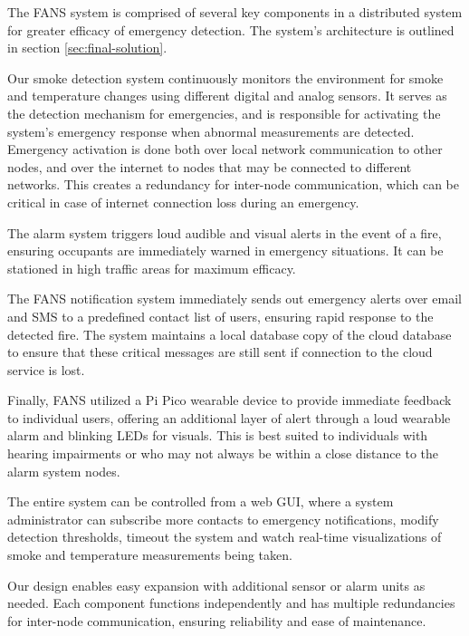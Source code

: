 The FANS system is comprised of several key components in a distributed system for greater efficacy of emergency
detection. The system's architecture is outlined in section \ref{sec:final-solution}.

Our smoke detection system continuously monitors the environment for smoke and temperature changes using different
digital and analog sensors. It serves as the detection mechanism for emergencies, and is responsible for activating the
system's emergency response when abnormal measurements are detected. Emergency activation is done both over local
network communication to other nodes, and over the internet to nodes that may be connected to different networks. This
creates a redundancy for inter-node communication, which can be critical in case of internet connection loss during an
emergency.

The alarm system triggers loud audible and visual alerts in the event of a fire, ensuring occupants are immediately
warned in emergency situations. It can be stationed in high traffic areas for maximum efficacy.

The FANS notification system immediately sends out emergency alerts over email and SMS to a predefined contact list of
users, ensuring rapid response to the detected fire. The system maintains a local database copy of the cloud database
to ensure that these critical messages are still sent if connection to the cloud service is lost.

Finally, FANS utilized a Pi Pico wearable device to provide immediate feedback to individual users, offering an
additional layer of alert through a loud wearable alarm and blinking LEDs for visuals. This is best suited to
individuals with hearing impairments or who may not always be within a close distance to the alarm system nodes.

The entire system can be controlled from a web GUI, where a system administrator can subscribe more contacts to
emergency notifications, modify detection thresholds, timeout the system and watch real-time visualizations of smoke
and temperature measurements being taken.

Our design enables easy expansion with additional sensor or alarm units as needed. Each component functions
independently and has multiple redundancies for inter-node communication, ensuring reliability and ease of maintenance.
